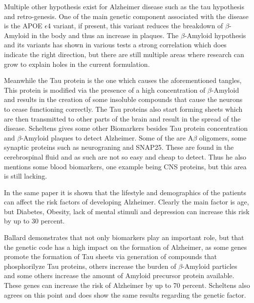 Multiple other hypothesis exist for Alzheimer disease\cite{Scheltens2016} such as the tau hypothesis and retro-genesis. One of the main genetic component associated with the disease is the APOE $\epsilon4$ variant, if present, this variant reduces the breakdown of $\beta$-Amyloid in the body and thus an increase in plaques. The $\beta$-Amyloid hypothesis and its variants has shown in various tests a strong correlation which does indicate the right direction, but there are still multiple areas where research can grow to explain holes in the current formulation.

Meanwhile the Tau protein is the one which causes the aforementioned tangles, This protein is modified via the presence of a high concentration of $\beta$-Amyloid and results in the creation of some insoluble compounds that cause the neurons to cease functioning correctly. The Tau proteins also start forming sheets which are then transmitted to other parts of the brain and result in the spread of the disease. 
\newpage
Scheltens gives \cite{Scheltens2016} some other Biomarkers besides Tau protein concentration and $\beta$-Amyloid plaques to detect Alzheimer. Some of the are A$\beta$ oligomers, some synaptic proteins such as neurograning and SNAP25. These are found in the cerebrospinal fluid and as such are not so easy and cheap to detect. Thus he also mentions some blood biomarkers, one example being CNS proteins, but this area is still lacking.

In the same paper \cite{Scheltens2016} it is shown that the lifestyle and demographics of the patients can affect the risk factors of developing Alzheimer. Clearly the main factor is age, but Diabetes, Obesity, lack of mental stimuli and depression can increase this risk by up to 30 percent.

Ballard demonstrates that not only biomarkers play an important role, but that the genetic code has a high impact on the formation of Alzheimer, as some genes promote the formation of Tau sheets via generation of compounds that phosphorilyze Tau proteins, others increase the burden of  $\beta$-Amyloid particles and some others increase the amount of Amyloid precursor protein available. These genes can increase the risk of Alzheimer by up to 70 percent. Scheltens also agrees on this point and does show the same results regarding the genetic factor.

